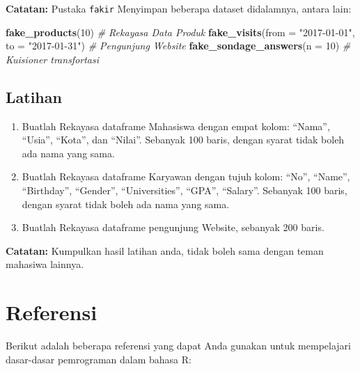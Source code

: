\documentclass[
]{book}
\newenvironment{Shaded}{\begin{snugshade}}{\end{snugshade}}
\newcommand{\AttributeTok}[1]{\textcolor[rgb]{0.13,0.29,0.53}{#1}}
\newcommand{\CommentTok}[1]{\textcolor[rgb]{0.56,0.35,0.01}{\textit{#1}}}
\newcommand{\DecValTok}[1]{\textcolor[rgb]{0.00,0.00,0.81}{#1}}
\newcommand{\FunctionTok}[1]{\textcolor[rgb]{0.13,0.29,0.53}{\textbf{#1}}}
\newcommand{\NormalTok}[1]{#1}
\newcommand{\StringTok}[1]{\textcolor[rgb]{0.31,0.60,0.02}{#1}}
\begin{document}
\textbf{Catatan:} Pustaka \texttt{fakir} Menyimpan beberapa dataset didalamnya, antara lain:

\begin{Shaded}
\begin{Highlighting}[]
\FunctionTok{fake\_products}\NormalTok{(}\DecValTok{10}\NormalTok{)                                   }\CommentTok{\# Rekayasa Data Produk }
\FunctionTok{fake\_visits}\NormalTok{(}\AttributeTok{from =} \StringTok{"2017{-}01{-}01"}\NormalTok{, }\AttributeTok{to =} \StringTok{"2017{-}01{-}31"}\NormalTok{) }\CommentTok{\# Pengunjung Website}
\FunctionTok{fake\_sondage\_answers}\NormalTok{(}\AttributeTok{n =} \DecValTok{10}\NormalTok{)                        }\CommentTok{\# Kuisioner transfortasi}
\end{Highlighting}
\end{Shaded}

\hypertarget{latihan-1}{%
\section{Latihan}\label{latihan-1}}

\begin{enumerate}
\def\labelenumi{\arabic{enumi}.}
\item
  Buatlah Rekayasa dataframe Mahasiswa dengan empat kolom: ``Nama'', ``Usia'', ``Kota'', dan ``Nilai''. Sebanyak 100 baris, dengan syarat tidak boleh ada nama yang sama.
\item
  Buatlah Rekayasa dataframe Karyawan dengan tujuh kolom: ``No'', ``Name'', ``Birthday'', ``Gender'', ``Universities'', ``GPA'', ``Salary''. Sebanyak 100 baris, dengan syarat tidak boleh ada nama yang sama.
\item
  Buatlah Rekayasa dataframe pengunjung Website, sebanyak 200 baris.
\end{enumerate}

\textbf{Catatan:} Kumpulkan hasil latihan anda, tidak boleh sama dengan teman mahasiwa lainnya.

\hypertarget{referensi}{%
\chapter{Referensi}\label{referensi}}

Berikut adalah beberapa referensi yang dapat Anda gunakan untuk mempelajari dasar-dasar pemrograman dalam bahasa R:
\end{document}
